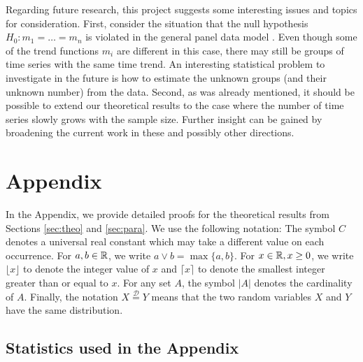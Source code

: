 \documentclass[a4paper,12pt]{article}
\makeatletter
\renewcommand{\eqref}[1]{\tagform@{\ref{#1}}}
\makeatother
\begin{document}
Regarding future research, this project suggests some interesting issues and topics for consideration. First, consider the situation that the null hypothesis $H_0: m_1 = \ldots = m_n$ is violated in the general panel data model \eqref{eq:model}. Even though some of the trend functions $m_i$ are different in this case, there may still be groups of time series with the same time trend. An interesting statistical problem to investigate in the future is how to estimate the unknown groups (and their unknown number) from the data. Second, as was already mentioned, it should be possible to extend our theoretical results to the case where the number of time series slowly grows with the sample size. Further insight can be gained by broadening the current work in these and possibly other directions.

\newpage

{\small
\setlength{\bibsep}{0.55em}
}

\newpage
\appendix
\section{Appendix}\label{appendix}
In the Appendix, we provide detailed proofs for the theoretical results from Sections \ref{sec:theo} and \ref{sec:para}. We use the following notation: The symbol $C$ denotes a universal real constant which may take a different value on each occurrence. For $a,b \in \mathbb{R}$, we write $a \vee b = \max\{a,b\}$. For $x \in \mathbb{R}, x \geq 0$, we write $\lfloor x \rfloor$ to denote the integer value of $x$ and $\lceil x \rceil$ to denote the smallest integer greater than or equal to $x$. For any set $A$, the symbol $|A|$ denotes the cardinality of $A$. Finally, the notation $X \stackrel{\mathcal{D}}{=} Y$ means that the two random variables $X$ and $Y$ have the same distribution. %


\subsection{Statistics used in the Appendix}\label{subsec:appendix:stats}
\end{document}
